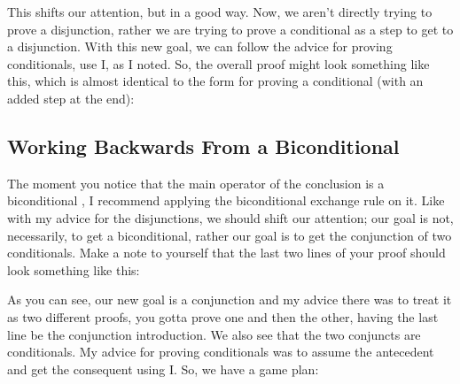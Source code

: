 This shifts our attention, but in a good way. Now, we aren't directly trying to prove a disjunction, rather we are trying to prove a conditional as a step to get to a disjunction. With this new goal, we can follow the advice for proving conditionals, use \eif I, as I noted. So, the overall proof might look something like this, which is almost identical to the form for proving a conditional (with an added step at the end): 
\begin{fitchproof}
\ellipsesline			
{}			
\open
{}			
\ellipsesline		
{}			
\close
{}
 	
\end{fitchproof}

\subsection{Working Backwards From a Biconditional}

The moment you notice that the main operator of the conclusion is a biconditional \eiff{}, I recommend applying the biconditional exchange rule on it. Like with my advice for the disjunctions, we should shift our attention; our goal is not, necessarily, to get a biconditional, rather our goal is to get the conjunction of two conditionals. Make a note to yourself that the last two lines of your proof should look something like this:

\begin{fitchproof}
 {}
\end{fitchproof}

As you can see, our new goal is a conjunction and my advice there was to treat it as two different proofs, you gotta prove one and then the other, having the last line be the conjunction introduction. We also see that the two conjuncts are conditionals. My advice for proving conditionals was to assume the antecedent and get the consequent using \eif I. So, we have a game plan:
\begin{fitchproof}
\ellipsesline			
{}			
\open
{}			
\ellipsesline		
{}			
\close
{}	
\open
{}			
\ellipsesline		
{}			
\close
{}	
 
\end{fitchproof}

